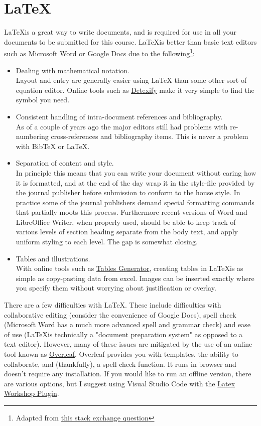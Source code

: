 \section{\LaTeX}
\LaTeX is a great way to write documents, and is required for use in all your documents to be submitted for this course. \LaTeX is better than basic text editors such as Microsoft Word or Google Docs due to the following\footnote{Adapted from \href{https://academia.stackexchange.com/questions/5414/what-are-the-advantages-or-disadvantages-of-using-latex-for-writing-scientific-p}{this stack exchange question}}:
\begin{itemize}
    \item Dealing with mathematical notation.\\
    Layout and entry are generally easier using LaTeX than some other sort of equation editor. Online tools such as \href{http://detexify.kirelabs.org/classify.html}{Detexify} make it very simple to find the symbol you need.
    \item Consistent handling of intra-document references and bibliography.\\
    As of a couple of years ago the major editors still had problems with re-numbering cross-references and bibliography items. This is never a problem with BibTeX or LaTeX.
    \item Separation of content and style.\\
    In principle this means that you can write your document without caring how it is formatted, and at the end of the day wrap it in the style-file provided by the journal publisher before submission to conform to the house style. In practice some of the journal publishers demand special formatting commands that partially moots this process. Furthermore recent versions of Word and LibreOffice Writer, when properly used, should be able to keep track of various levels of section heading separate from the body text, and apply uniform styling to each level. The gap is somewhat closing.
    \item Tables and illustrations.\\
    With online tools such as \href{https://www.tablesgenerator.com/}{Tables Generator}, creating tables in \LaTeX is as simple as copy-pasting data from excel. Images can be inserted exactly where you specify them without worrying about justification or overlay.
\end{itemize}

There are a few difficulties with \LaTeX. These include difficulties with collaborative editing (consider the convenience of Google Docs), spell check (Microsoft Word has a much more advanced spell and grammar check) and ease of use (\LaTeX is technically a "document preparation system" as opposed to a text editor). However, many of these issues are mitigated by the use of an online tool known as \href{https://www.overleaf.com}{Overleaf}. Overleaf provides you with templates, the ability to collaborate, and (thankfully), a spell check function. It runs in browser and doesn't require any installation. If you would like to run an offline version, there are various options, but I suggest using Visual Studio Code with the \href{https://github.com/James-Yu/LaTeX-Workshop/wiki/Install}{Latex Workshop Plugin}.